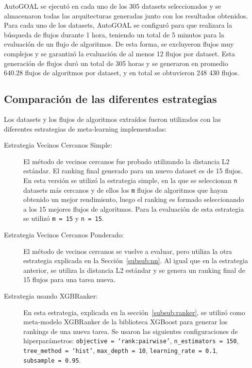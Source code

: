 \documentclass[a4paper,12pt]{article}
\begin{document}
AutoGOAL se ejecutó en cada uno de los 305 datasets seleccionados y se almacenaron todas las arquitecturas generadas junto con los resultados obtenidos. Para cada uno de los datasets, AutoGOAL se configuró para que realizara la búsqueda de flujos durante 1 hora, teniendo un total de 5 minutos para la evaluación de un flujo de algoritmos. De esta forma, se excluyeron flujos muy complejos y se garantizó la evaluación de al menos 12 flujos por dataset. Esta generación de flujos duró un total de 305 horas y se generaron en promedio 640.28 flujos de algoritmos por dataset, y en total se obtuvieron 248 430  flujos. 

\subsection{Comparación de las diferentes estrategias}

Los datasets y los flujos de algoritmos extraídos fueron utilizados con las diferentes estrategias de meta-learning implementadas:

\begin{description}
	\item[Estrategia Vecinos Cercanos Simple:] El método de vecinos cercanos fue probado utilizando la distancia L2 estándar. El ranking final generado para un nuevo dataset es de 15 flujos. En esta versión se utilizó la estrategia simple, en la que se seleccionan \texttt{n} datasets más cercanos y de ellos los \texttt{m} flujos de algoritmos que hayan obtenido un mejor rendimiento, luego el ranking es formado seleccionando a los 15 mejores flujos de algoritmos. Para la evaluación de esta estrategia se utilizó \texttt{m = 15} y \texttt{n = 15}.
	\item[Estrategia Vecinos Cercanos Ponderado:] El método de vecinos cercanos se vuelve a evaluar, pero utiliza la otra estrategia explicada en la Sección~\ref{subsub:nn}. Al igual que en la estrategia anterior, se utiliza la distancia L2 estándar y se genera un ranking final de 15 flujos para una tarea nueva.
	\item[Estrategia usando XGBRanker:] En esta estrategia, explicada en la sección~\ref{subsub:ranker}, se utilizó como meta-modelo XGBRanker de la biblioteca XGBoost para generar los rankings de una nueva tarea. Se usaron las siguientes configuraciones de hiperparámetros: \texttt{objective = `rank:pairwise'}, \texttt{n\_estimators = 150}, \texttt{tree\_method = `hist'}, \texttt{max\_depth = 10}, \texttt{learning\_rate = 0.1}, \texttt{subsample = 0.95}.
\end{description}
\end{document}
